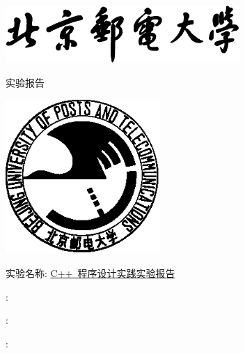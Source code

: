 \begin{titlepage}
    \center
    \includegraphics[width=3.5in]{images/buptname.eps}

    \begin{spacing}{5}
        {\bigsize 实验报告}
    \end{spacing}

    \includegraphics[width=2.3in]{images/buptseal.eps}

    \begin{spacing}{1}
        \vspace{2.5cm}
        \Large 实验名称: \underline{C++~程序设计实践实验报告}
        \vspace{3cm}
    \end{spacing}

    \begin{minipage}{0.32\linewidth}
         : \underline{}

         : \underline{}

         : \underline{}


    \end{minipage}

\end{titlepage}

